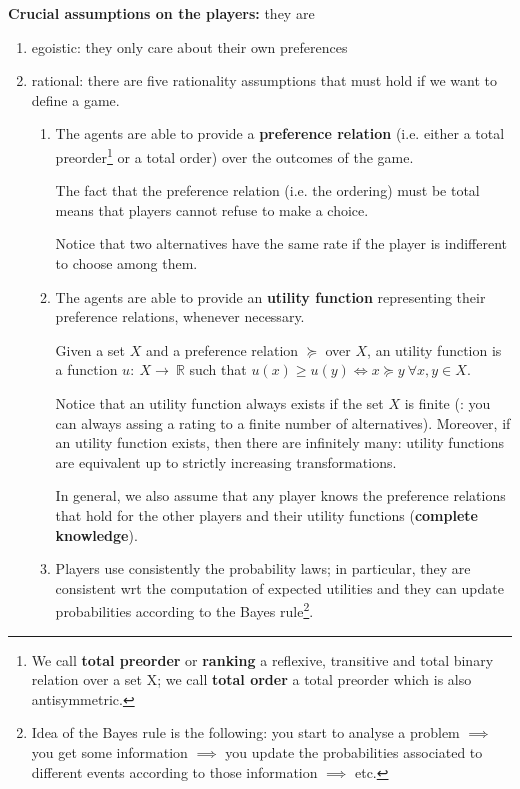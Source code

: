 \noindent \textbf{Crucial assumptions on the players:} they are
\begin{enumerate}
	\item egoistic: they only care about their own preferences
	\item rational: there are five rationality assumptions that must hold if 
	we want to define a game.
	\begin{enumerate}
		\item The agents are able to provide a \textbf{preference relation} 
		(i.e. either a total preorder\footnote{We call \textbf{total preorder} 
		or \textbf{ranking} a reflexive, transitive and total binary relation 
		over a set X; we call \textbf{total order} a total preorder which is 
		also antisymmetric.} 
		or a total order) over the outcomes of the game.

		\noindent The fact that the preference relation (i.e. the ordering) 
		must be total means that players cannot refuse to make a choice.

		\noindent Notice that two alternatives have the same rate if the player 
		is indifferent to choose among them.

		\item The agents are able to provide an \textbf{utility function} 
		representing their preference relations, whenever necessary.

		\noindent Given a set $X$ and a preference relation $\succeq$ over $X$, 
		an utility function is a function $u:~X\rightarrow~\mathbb{R}$ 
		such that $u(x) \geq u(y) \iff x \succeq y ~\forall x,y \in X$.

		\noindent Notice that an utility function always exists if the set $X$ 
		is finite (: you can always assing a rating to a finite number of 
		alternatives). Moreover, if an utility function exists, then there are 
		infinitely many: utility functions are equivalent up to strictly 
		increasing transformations.

		\noindent In general, we also assume that any player knows the 
		preference relations that hold for the other players and their 
		utility functions (\textbf{complete knowledge}).

		\item Players use consistently the probability laws; in particular, 
		they are consistent wrt the computation of expected utilities and 
		they can update probabilities according to the Bayes 
		rule\footnote{Idea of the Bayes rule is the following: you start to 
		analyse a problem $\implies$ you get some information $\implies$ you 
		update the probabilities associated to different events according to 
		those information $\implies$ etc.}.


\end{enumerate}
\end{enumerate}
